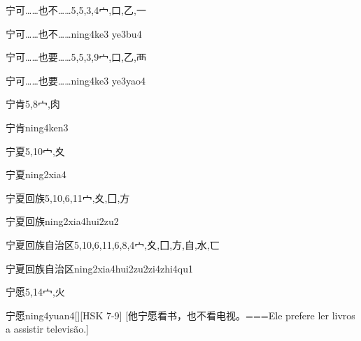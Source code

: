 \begin{Entry}{宁可……也不……}{5,5,3,4}{⼧,⼝,⼄,⼀}
  \begin{Phonetics}{宁可……也不……}{ning4ke3 ye3bu4}
  \end{Phonetics}
\end{Entry}

\begin{Entry}{宁可……也要……}{5,5,3,9}{⼧,⼝,⼄,⾑}
  \begin{Phonetics}{宁可……也要……}{ning4ke3 ye3yao4}
  \end{Phonetics}
\end{Entry}

\begin{Entry}{宁肯}{5,8}{⼧,⾁}
  \begin{Phonetics}{宁肯}{ning4ken3}
  \end{Phonetics}
\end{Entry}

\begin{Entry}{宁夏}{5,10}{⼧,⼢}
  \begin{Phonetics}{宁夏}{ning2xia4}
  \end{Phonetics}
\end{Entry}

\begin{Entry}{宁夏回族}{5,10,6,11}{⼧,⼢,⼞,⽅}
  \begin{Phonetics}{宁夏回族}{ning2xia4hui2zu2}
  \end{Phonetics}
\end{Entry}

\begin{Entry}{宁夏回族自治区}{5,10,6,11,6,8,4}{⼧,⼢,⼞,⽅,⾃,⽔,⼖}
  \begin{Phonetics}{宁夏回族自治区}{ning2xia4hui2zu2zi4zhi4qu1}
  \end{Phonetics}
\end{Entry}

\begin{Entry}{宁愿}{5,14}{⼧,⽕}
  \begin{Phonetics}{宁愿}{ning4yuan4}[][HSK 7-9]
    [他宁愿看书，也不看电视。===Ele prefere ler livros a assistir televisão.]
  \end{Phonetics}
\end{Entry}

